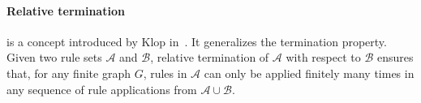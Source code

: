 \paragraph{Relative termination} is a concept introduced by Klop in~\cite{klop1987term}. It generalizes the termination property.
 Given two rule sets \( \mathcal{A} \) and \( \mathcal{B} \), relative termination of \( \mathcal{A} \) with respect to \( \mathcal{B} \) ensures that, for any finite graph $G$,
rules in $\mathcal{A}$ can only be applied finitely many times in any sequence of rule applications from $\mathcal{A} \cup \mathcal{B}$.
  
